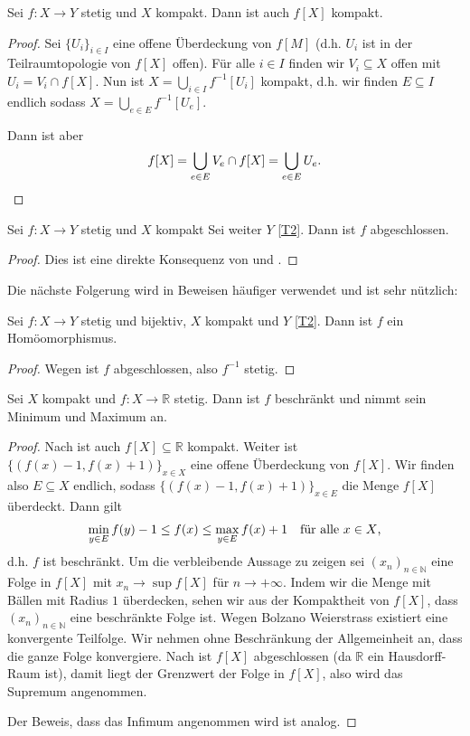 \documentclass[
12pt, 
openany, 
a4paper, 
final,
fleqn, 
]{myclass}
\numberwithin{equation}{chapter}
\numberwithin{section}{chapter}
\newcommand{\NN}{\mathbb N}
\newcommand{\RR}{\mathbb R}
\newcommand{\union}{\bigcup}
\newcommand{\todo}[1]{}
\begin{document}
\begin{thr}\label{4.7}
Sei $f: X \to Y$ stetig und $X$ kompakt. Dann ist auch $f[X]$ kompakt. 
\end{thr}
\begin{proof}
Sei $ \{U_{i}\}_{i\in I} $ eine offene Überdeckung von $ f[M] $ (d.h. $ U_{i} $ ist in der Teilraumtopologie von $f[X]$ offen). Für alle $i\in I$ finden wir $V_{i}\subseteq X$ offen mit $U_{i}= V_{i}\cap f[X]$. Nun ist $ X = \union_{i\in I}f^{-1}[U_{i}] $ kompakt, d.h. wir finden $E\subseteq I$ endlich sodass $X = \union_{e \in E}f^{-1}[U_{e}]$. 

Dann ist aber
\[ 
f[X] = \union_{e\in E}V_{e}\cap f[X] = \union_{e \in E}U_{e}. \qedhere
\]
\todo{Hier sind noch Fehler}
\end{proof}

\begin{cor}\label{4.8}
Sei $f: X\to Y$ stetig und $X$ kompakt Sei weiter $Y$ \ref{T2}. Dann ist $f$ abgeschlossen.
\end{cor}
\begin{proof}
Dies ist eine direkte Konsequenz von  und .
\end{proof}
Die nächste Folgerung wird in Beweisen häufiger verwendet und ist sehr nützlich: 
\begin{cor}\label{4.9}
Sei $f: X\to Y$ stetig und bijektiv, $ X $ kompakt und $ Y $ \ref{T2}. Dann ist $f$ ein Homöomorphismus. 
\end{cor}
\begin{proof}
Wegen  ist $f$ abgeschlossen, also $f^{-1}$ stetig. 
\end{proof}

\begin{cor}\label{4.10}
Sei $X$ kompakt und $f: X \to \RR$ stetig. Dann ist $f$ beschränkt und nimmt sein Minimum und Maximum an. 
\end{cor}

\begin{proof}
Nach  ist auch $f[X]\subseteq \RR$ kompakt. Weiter ist $ \{(f(x)-1, f(x) + 1)\}_{x\in X} $ eine offene Überdeckung von $f[X]$. Wir finden also $E\subseteq X$ endlich, sodass $\{(f(x)- 1, f(x)+1)\}_{x\in E}$ die Menge $f[X]$ überdeckt. Dann gilt
\[
\min_{y\in E} f(y)-1 \leq f(x) \leq \max_{y\in E}f(x) +1 \quad \text{für alle $ x\in X $,}
\]
d.h. $f$ ist beschränkt. Um die verbleibende Aussage zu zeigen sei $ (x_{n})_{n\in \NN}$ eine Folge in $ f[X] $ mit $ x_n\to \sup f[X] $ für $ n\to+\infty $.  Indem wir die Menge mit Bällen mit Radius $1$ überdecken, sehen wir aus der Kompaktheit von $f[X]$, dass $ (x_{n})_{n\in \NN} $ eine beschränkte Folge ist. Wegen Bolzano Weierstrass existiert eine konvergente Teilfolge. Wir nehmen ohne Beschränkung der Allgemeinheit an, dass die ganze Folge konvergiere. Nach  ist $f[X]$ abgeschlossen (da $\RR$ ein Hausdorff-Raum ist), damit liegt der Grenzwert der Folge in $f[X]$, also wird das Supremum angenommen. 

Der Beweis, dass das Infimum angenommen wird ist analog. 
\end{proof}
\end{document}
